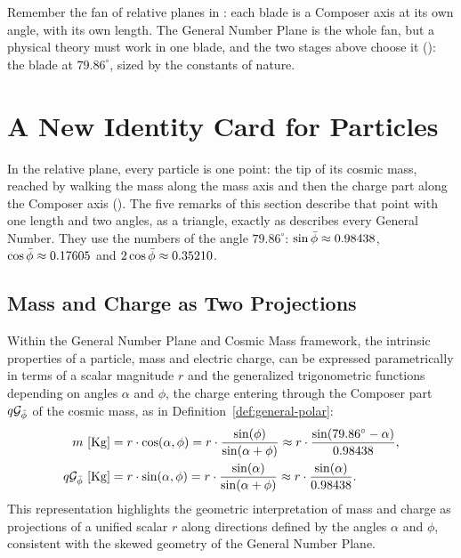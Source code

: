\begin{plainwords}
Remember the fan of relative planes in : each blade is a Composer axis at its own angle, with its own length. The General Number Plane is the whole fan, but a physical theory must work in one blade, and the two stages above choose it (): the blade at $79.86^\circ$, sized by the constants of nature.
\end{plainwords}

\section{A New Identity Card for Particles}\label{sec:identity}

In the relative plane, every particle is one point: the tip of its cosmic mass, reached by walking the mass along the mass axis and then the charge part along the Composer axis (). The five remarks of this section describe that point with one length and two angles, as a triangle, exactly as  describes every General Number. They use the numbers of the angle $79.86^\circ$: $\sin\bar{\phi} \approx 0.98438$, $\cos\bar{\phi} \approx 0.17605$ and $2\cos\bar{\phi} \approx 0.35210$.

\subsection{Mass and Charge as Two Projections}\label{subsec:id-projections}

\begin{remark}\label{rem:mass-charge-rep}
Within the General Number Plane and Cosmic Mass framework, the intrinsic properties of a particle, mass and electric charge, can be expressed parametrically in terms of a scalar magnitude $r$ and the generalized trigonometric functions depending on angles $\alpha$ and $\phi$, the charge entering through the Composer part $q\mathcal{G}_{\bar{\phi}}$ of the cosmic mass, as in Definition~\ref{def:general-polar}:
\begin{align*}
m\ [\mathrm{Kg}] &= r \cdot \cos(\alpha, \phi) = r \cdot \frac{\sin(\phi)}{\sin(\alpha + \phi)} \approx r \cdot \frac{\sin(79.86^\circ - \alpha)}{0.98438}, \\
q\mathcal{G}_{\bar{\phi}}\ [\mathrm{Kg}] &= r \cdot \sin(\alpha, \phi) = r \cdot \frac{\sin(\alpha)}{\sin(\alpha + \phi)} \approx r \cdot \frac{\sin(\alpha)}{0.98438}.
\end{align*}
This representation highlights the geometric interpretation of mass and charge as projections of a unified scalar $r$ along directions defined by the angles $\alpha$ and $\phi$, consistent with the skewed geometry of the General Number Plane.
\end{remark}

